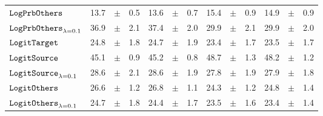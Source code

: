 \documentclass[../main.tex]{subfiles}
\begin{document}
\begin{tabular}{lrrrrrrrrrrrr}
$\mathtt{LogPrbOthers}_{}$              & 13.7                            & $\pm$                                        & 0.5                        & 13.6                                                                                 & $\pm$ & 0.7                                & 15.4  & $\pm$ & 0.9             & 14.9  & $\pm$ & 0.9                           \\
\rowcolor{lightgray}
$\mathtt{LogPrbOthers}_{\lambda=0.1}$   & 36.9                            & $\pm$                                        & 2.1                        & 37.4                                                                                   & $\pm$ & 2.0                                & 29.9  & $\pm$ & 2.1             & 29.9  & $\pm$ & 2.0                           \\
$\mathtt{LogitTarget}$                 & 24.8                            & $\pm$                                        & 1.8                        & 24.7                                                                                     & $\pm$ & 1.9                                & 23.4  & $\pm$ & 1.7             & 23.5  & $\pm$ & 1.7                           \\
\rowcolor{lightgray}
$\mathtt{LogitSource}_{}$               & 45.1                            & $\pm$                                        & 0.9                        & 45.2                                                                                   & $\pm$ & 0.8                                & 48.7  & $\pm$ & 1.3             & 48.2  & $\pm$ & 1.2                           \\
$\mathtt{LogitSource}_{\lambda=0.1}$    & 28.6                            & $\pm$                                        & 2.1                        & 28.6                                                                                   & $\pm$ & 1.9                                & 27.8  & $\pm$ & 1.9             & 27.9  & $\pm$ & 1.8                           \\
$\mathtt{LogitOthers}_{}$               & 26.6                            & $\pm$                                        & 1.2                        & 26.8                                                                                 & $\pm$ & 1.1                                & 24.3  & $\pm$ & 1.2             & 24.8  & $\pm$ & 1.4                           \\
$\mathtt{LogitOthers}_{\lambda=0.1}$    & 24.7                            & $\pm$                                        & 1.8                        & 24.4                                                                                   & $\pm$ & 1.7                                & 23.5  & $\pm$ & 1.6             & 23.4  & $\pm$ & 1.4                           \\

\end{tabular}
\end{document}
